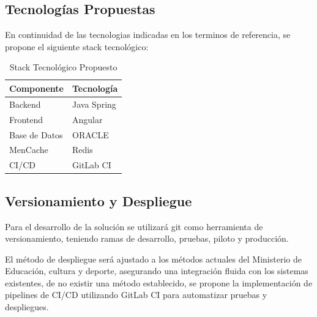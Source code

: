 \subsection{Tecnologías Propuestas}
En continuidad de las tecnologias indicadas en los terminos de referencia, se propone el siguiente stack tecnológico:

\begin{table}[h]
\centering
\begin{tabular}{|l|l|}
\hline
\textbf{Componente} & \textbf{Tecnología} \\
\hline
Backend & Java Spring \\
Frontend & Angular \\
Base de Datos & ORACLE \\
MenCache & Redis \\
CI/CD & GitLab CI \\
\hline
\end{tabular}
\caption{Stack Tecnológico Propuesto}
\label{tab:stack_tecnologico}
\end{table}

\subsection{Versionamiento y Despliegue}

Para el desarrollo de la solución se utilizará git como herramienta de versionamiento, teniendo ramas de desarrollo, pruebas, piloto y producción.

El método de despliegue será ajustado a los métodos actuales del Ministerio de Educación, cultura y deporte, asegurando una integración fluida con los sistemas existentes, de no existir una método establecido, se propone la implementación de pipelines de CI/CD utilizando GitLab CI para automatizar pruebas y despliegues.